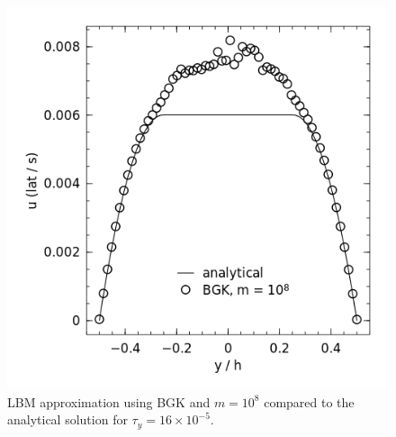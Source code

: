 \begin{figure}
	\centering
    \includegraphics[width=\linewidth]{figs/poise-bingham/bgk-8/analytical-vs-approx.png}
    \caption{LBM approximation using BGK and $m = 10^8$ compared to the analytical solution for $\tau_y = 16 \times 10^{-5}$.}
\label{fig:bing-analyt-bgk-8}
\end{figure}

